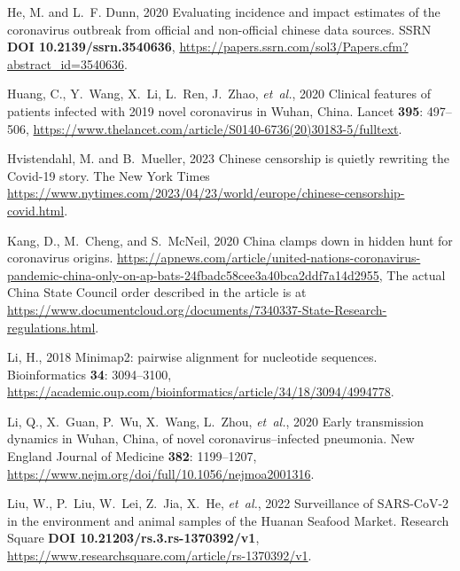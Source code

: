 \documentclass[9pt,twocolumn,twoside]{gsajnl_modified}
\begin{document}
{\begin{thebibliography}{44}
{He, M. {\rm and} L.~F. Dunn}, 2020 Evaluating incidence and impact estimates
  of the coronavirus outbreak from official and non-official chinese data
  sources. SSRN {\bf DOI 10.2139/ssrn.3540636},
  \url{https://papers.ssrn.com/sol3/Papers.cfm?abstract_id=3540636}.

{Huang, C., Y.~Wang, X.~Li, L.~Ren, J.~Zhao, {\em et~al.\/}}, 2020 Clinical
  features of patients infected with 2019 novel coronavirus in {Wuhan, China}.
  Lancet {\bf 395}: 497--506,
  \url{https://www.thelancet.com/article/S0140-6736(20)30183-5/fulltext}.

{Hvistendahl, M. {\rm and} B.~Mueller}, 2023 Chinese censorship is quietly
  rewriting the {Covid-19} story. The New York Times
  \url{https://www.nytimes.com/2023/04/23/world/europe/chinese-censorship-covid.html}.

{Kang, D., M.~Cheng, {\rm and} S.~McNeil}, 2020 China clamps down in hidden
  hunt for coronavirus origins.
  \url{https://apnews.com/article/united-nations-coronavirus-pandemic-china-only-on-ap-bats-24fbadc58cee3a40bca2ddf7a14d2955},
  The actual China State Council order described in the article is at
  \url{https://www.documentcloud.org/documents/7340337-State-Research-regulations.html}.

{Li, H.}, 2018 Minimap2: pairwise alignment for nucleotide sequences.
  Bioinformatics {\bf 34}: 3094--3100,
  \url{https://academic.oup.com/bioinformatics/article/34/18/3094/4994778}.

{Li, Q., X.~Guan, P.~Wu, X.~Wang, L.~Zhou, {\em et~al.\/}}, 2020 {Early
  transmission dynamics in Wuhan, China, of novel coronavirus--infected
  pneumonia}. New England Journal of Medicine {\bf 382}: 1199--1207,
  \url{https://www.nejm.org/doi/full/10.1056/nejmoa2001316}.

{Liu, W., P.~Liu, W.~Lei, Z.~Jia, X.~He, {\em et~al.\/}}, 2022 {Surveillance of
  SARS-CoV-2 in the environment and animal samples of the Huanan Seafood
  Market}. Research Square {\bf DOI 10.21203/rs.3.rs-1370392/v1},
  \url{https://www.researchsquare.com/article/rs-1370392/v1}.


\end{thebibliography}}
\end{document}
